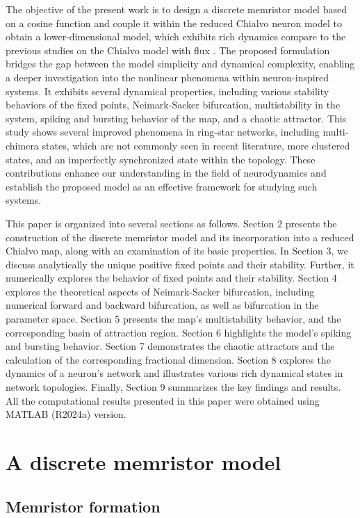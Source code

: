 \documentclass{article}
\begin{document}
The objective of the present work is to design a discrete memristor model based on a cosine function and couple it within the reduced Chialvo neuron model to obtain a lower-dimensional model, which exhibits rich dynamics compare to the previous studies on the Chialvo model with flux \cite{muni2022dynamical,kumar2026study}. The proposed formulation bridges the gap between the model simplicity and dynamical complexity, enabling a deeper investigation into the nonlinear phenomena within neuron-inspired systems. It exhibits several dynamical properties, including various stability behaviors of the fixed points, Neimark-Sacker bifurcation, multistability in the system, spiking and bursting behavior of the map, and a chaotic attractor. This study shows several improved phenomena in ring-star networks, including multi-chimera states, which are not commonly seen in recent literature, more clustered states, and an imperfectly synchronized state within the topology. These contributions enhance our understanding in the field of neurodynamics and establish the proposed model as an effective framework for studying such systems.

This paper is organized into several sections as follows. Section 2 presents the construction of the discrete memristor model and its incorporation into a reduced Chialvo map, along with an examination of its basic properties. In Section 3, we discuss analytically the unique positive fixed points and their stability. Further, it numerically explores the behavior of fixed points and their stability. Section 4 explores the theoretical aspects of Neimark-Sacker bifurcation, including numerical forward and backward bifurcation, as well as bifurcation in the parameter space. Section 5 presents the map's multistability behavior, and the corresponding basin of attraction region. Section 6 highlights the model's spiking and bursting behavior. Section 7 demonstrates the chaotic attractors and the calculation of the corresponding fractional dimension. Section 8 explores the dynamics of a neuron's network and illustrates various rich dynamical states in network topologies. Finally, Section 9 summarizes the key findings and results. All the computational results presented in this paper were obtained using MATLAB (R2024a) version.


\section{A discrete memristor model} 

\subsection{Memristor formation} 
\end{document}
